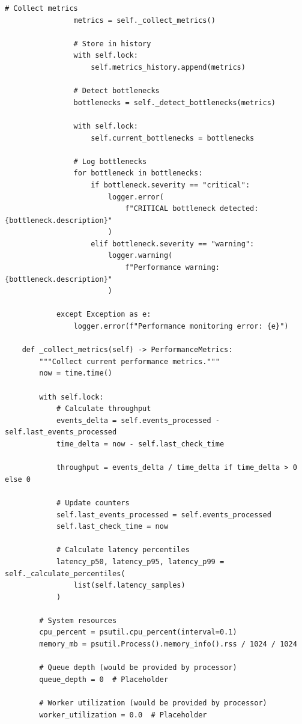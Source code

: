 \begin{lstlisting}[style=python, caption={Performance Monitor with Bottleneck Detection}]
                # Collect metrics
                metrics = self._collect_metrics()

                # Store in history
                with self.lock:
                    self.metrics_history.append(metrics)

                # Detect bottlenecks
                bottlenecks = self._detect_bottlenecks(metrics)

                with self.lock:
                    self.current_bottlenecks = bottlenecks

                # Log bottlenecks
                for bottleneck in bottlenecks:
                    if bottleneck.severity == "critical":
                        logger.error(
                            f"CRITICAL bottleneck detected: {bottleneck.description}"
                        )
                    elif bottleneck.severity == "warning":
                        logger.warning(
                            f"Performance warning: {bottleneck.description}"
                        )

            except Exception as e:
                logger.error(f"Performance monitoring error: {e}")

    def _collect_metrics(self) -> PerformanceMetrics:
        """Collect current performance metrics."""
        now = time.time()

        with self.lock:
            # Calculate throughput
            events_delta = self.events_processed - self.last_events_processed
            time_delta = now - self.last_check_time

            throughput = events_delta / time_delta if time_delta > 0 else 0

            # Update counters
            self.last_events_processed = self.events_processed
            self.last_check_time = now

            # Calculate latency percentiles
            latency_p50, latency_p95, latency_p99 = self._calculate_percentiles(
                list(self.latency_samples)
            )

        # System resources
        cpu_percent = psutil.cpu_percent(interval=0.1)
        memory_mb = psutil.Process().memory_info().rss / 1024 / 1024

        # Queue depth (would be provided by processor)
        queue_depth = 0  # Placeholder

        # Worker utilization (would be provided by processor)
        worker_utilization = 0.0  # Placeholder


\end{lstlisting}
